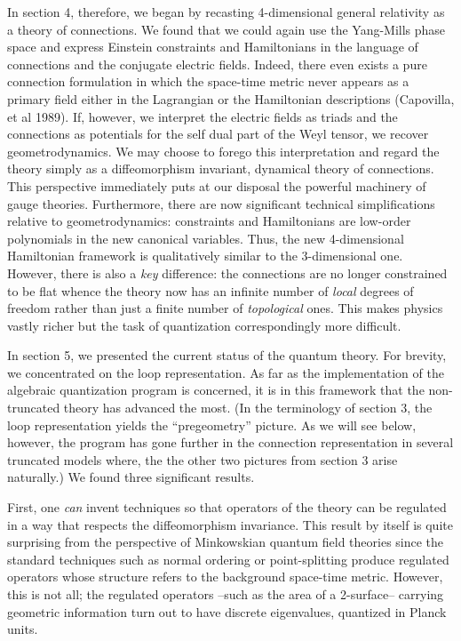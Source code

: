In section 4, therefore, we began by recasting 4-dimensional general
relativity as a theory of connections. We found that we could again use
the Yang-Mills phase space and express Einstein constraints and Hamiltonians
in the language of connections and the conjugate electric fields. Indeed,
there even exists a pure connection formulation in which the space-time
metric never appears as a primary field either in the Lagrangian or the
Hamiltonian descriptions (Capovilla, et al 1989). If, however, we interpret
the electric fields as triads and the connections as potentials for the
self dual part of the Weyl tensor, we recover geometrodynamics. We may choose
to forego this interpretation and regard the theory simply as a diffeomorphism
invariant, dynamical theory of connections. This perspective immediately
puts at our disposal the powerful machinery of gauge theories. Furthermore,
there are now significant technical
simplifications relative to geometrodynamics: constraints and
Hamiltonians are low-order polynomials in the new canonical variables. Thus,
the new 4-dimensional Hamiltonian framework is qualitatively similar to the
3-dimensional one. However, there is also a {\it key} difference: the
connections are no longer constrained to be flat whence the theory now has an
infinite number of {\it local} degrees of freedom rather than just a finite
number of {\it topological} ones. This makes physics vastly richer but the
task of quantization correspondingly more difficult.

In section 5, we presented the current status of the quantum theory. For
brevity, we concentrated on the loop representation. As far as the
implementation of the algebraic quantization program is concerned, it is
in this framework that the non-truncated theory has advanced the most.
(In the terminology of section 3, the loop representation yields
the ``pregeometry'' picture. As we will see below, however, the program has
gone further in the connection representation in several truncated models
where, the the other two pictures from section 3 arise naturally.) We found
three significant results.

First, one {\it can} invent techniques so that operators of the
theory can be regulated in a way that respects the diffeomorphism invariance.
This result by itself is quite surprising from the perspective of Minkowskian
quantum field theories since the standard techniques such as normal ordering
or point-splitting produce regulated operators whose structure refers to the
background  space-time metric. However, this is not all; the regulated
operators --such as the area of a 2-surface-- carrying geometric information
turn out to have discrete eigenvalues, quantized in Planck units.

